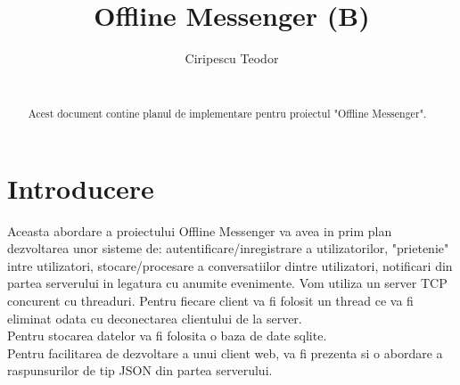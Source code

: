 \documentclass[runningheads]{llncs}
\begin{document}
\title{Offline Messenger (B)}
%
%
\author{Ciripescu Teodor\\
\\}
%
%
%
\maketitle              %
%
\begin{abstract}
Acest document contine planul de implementare pentru proiectul "Offline Messenger".

\end{abstract}
%
%
%
\section{Introducere}

Aceasta abordare a proiectului Offline Messenger va avea in prim plan dezvoltarea unor sisteme de: autentificare/inregistrare a utilizatorilor, "prietenie" intre utilizatori,  stocare/procesare a conversatiilor dintre utilizatori, notificari din partea serverului in legatura cu anumite evenimente. Vom utiliza un server TCP concurent cu threaduri. Pentru fiecare client va fi folosit un thread ce va fi eliminat odata cu deconectarea clientului de la server.\\
Pentru stocarea datelor va fi folosita o baza de date sqlite.\\
Pentru facilitarea de dezvoltare a unui client web, va fi prezenta si o abordare a raspunsurilor de tip JSON din partea serverului.\\
\end{document}
